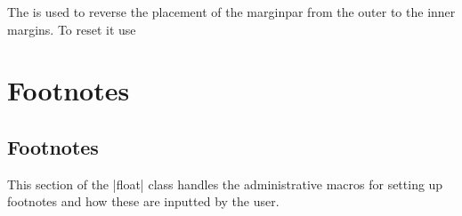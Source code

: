 %
 \begin{macro}{\@xympar}
    \begin{teX}
\def \@xympar{%
  \ifnum\@floatpenalty <\z@\@cons\@currlist\@marbox\fi
  \setbox\@tempboxa
    \color@vbox
      \vbox \bgroup
  \end@float
  \@ignorefalse
  \@esphack
}
    \end{teX}
 \end{macro}
%
 \begin{macro}{\reversemarginpar}
 \begin{macro}{\normalmarginpar}
 The \CMDI{\reversemarginpar} is used to reverse the placement of the marginpar from
 the outer to the inner margins. To reset it use \CMDI{\normalmarginpar}
    \begin{teX}
\def\reversemarginpar{\global\@mparbottom\z@ \@reversemargintrue}
\def\normalmarginpar{\global\@mparbottom\z@ \@reversemarginfalse}
    \end{teX}
 \end{macro}
 \end{macro}
%
\section{Footnotes}

    \begin{teX}
    \end{teX}
%
 \subsection{Footnotes}
%
This section of the |float| class handles the administrative macros for setting up footnotes
and how these are inputted by the user.


